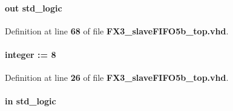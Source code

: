 \paragraph[{E\+P0\+F\+\_\+rempty}]{ {\bfseries \textcolor{keywordflow}{out}\textcolor{vhdlchar}{ }} {\bfseries \textcolor{comment}{std\+\_\+logic}\textcolor{vhdlchar}{ }} \hspace{0.3cm}{\ttfamily [Port]}}\label{classFX3__slaveFIFO5b__top_aa7f3782292ac873a82845cc08552196d}


Definition at line {\bf 68} of file {\bf F\+X3\+\_\+slave\+F\+I\+F\+O5b\+\_\+top.\+vhd}.

\paragraph[{E\+P0\+F\+\_\+rwidth}]{ {\bfseries \textcolor{vhdlchar}{ }} {\bfseries \textcolor{comment}{integer}\textcolor{vhdlchar}{ }\textcolor{vhdlchar}{ }\textcolor{vhdlchar}{\+:}\textcolor{vhdlchar}{=}\textcolor{vhdlchar}{ }\textcolor{vhdlchar}{ } \textcolor{vhdldigit}{8} \textcolor{vhdlchar}{ }} \hspace{0.3cm}{\ttfamily [Generic]}}\label{classFX3__slaveFIFO5b__top_a1ca3b537783b840476059260e90c4c08}


Definition at line {\bf 26} of file {\bf F\+X3\+\_\+slave\+F\+I\+F\+O5b\+\_\+top.\+vhd}.

\paragraph[{E\+P81\+\_\+aclrn}]{ {\bfseries \textcolor{keywordflow}{in}\textcolor{vhdlchar}{ }} {\bfseries \textcolor{comment}{std\+\_\+logic}\textcolor{vhdlchar}{ }} \hspace{0.3cm}{\ttfamily [Port]}}\label{classFX3__slaveFIFO5b__top_a666f1027a58d96228bb85900413274c9}


